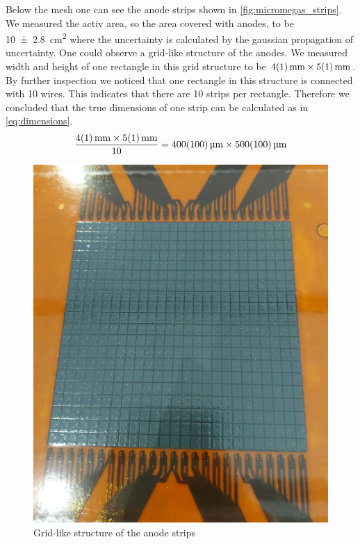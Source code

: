 \documentclass[sn-mathphys-num,iicol]{sn-jnl}
\theoremstyle{thmstyleone}
\theoremstyle{thmstyletwo}
\theoremstyle{thmstylethree}
\begin{document}
Below the mesh one can see the anode strips shown in \autoref{fig:micromegas_strips}.
We measured the activ area, so the area covered with anodes, to be \SI{10\pm2.8}{\cm^2} where the uncertainty is calculated by the gaussian propagation of uncertainty.
One could observe a grid-like structure of the anodes. 
We measured width and height of one rectangle in this grid structure to be $\SI{4\pm1}{\mm}\times\SI{5\pm1}{\mm}$.
By further inspection we noticed that one rectangle in this structure is connected with 10 wires.
This indicates that there are 10 strips per rectangle.
Therefore we concluded that the true dimensions of one strip can be calculated as in \autoref{eq:dimensions}.
\begin{equation}\label{eq:dimensions}
  \frac{\SI{4\pm1}{\mm}\times\SI{5\pm1}{\mm}}{10}=\SI{400\pm100}{\micro\meter}\times\SI{500\pm100}{\micro\meter}  
\end{equation}

\begin{figure}
  \includegraphics[width=\linewidth]{figures/micromegas_strips.jpeg}
  \caption{Grid-like structure of the anode strips}
  \label{fig:micromegas_strips}
\end{figure}
\end{document}
